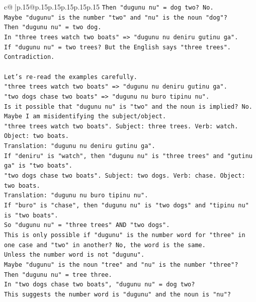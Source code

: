 \documentclass{article}
\begin{document}
{\begin{supertabular}{c@{$\;$}|p{.15\linewidth}@{}p{.15\linewidth}p{.15\linewidth}p{.15\linewidth}p{.15\linewidth}p{.15\linewidth}}
{{{\texttt{Then "dugunu nu" = dog two? No.} \\
\texttt{Maybe "dugunu" is the number "two" and "nu" is the noun "dog"?} \\
\texttt{Then "dugunu nu" = two dog.} \\
\texttt{In "three trees watch two boats" => "dugunu nu deniru gutinu ga".} \\
\texttt{If "dugunu nu" = two trees? But the English says "three trees".} \\
\texttt{Contradiction.} \\
\\ 
\texttt{Let's re{-}read the examples carefully.} \\
\texttt{"three trees watch two boats" => "dugunu nu deniru gutinu ga".} \\
\texttt{"two dogs chase two boats" => "dugunu nu buro tipinu nu".} \\
\texttt{Is it possible that "dugunu nu" is "two" and the noun is implied? No.} \\
\texttt{Maybe I am misidentifying the subject/object.} \\
\texttt{"three trees watch two boats". Subject: three trees. Verb: watch. Object: two boats.} \\
\texttt{Translation: "dugunu nu deniru gutinu ga".} \\
\texttt{If "deniru" is "watch", then "dugunu nu" is "three trees" and "gutinu ga" is "two boats".} \\
\texttt{"two dogs chase two boats". Subject: two dogs. Verb: chase. Object: two boats.} \\
\texttt{Translation: "dugunu nu buro tipinu nu".} \\
\texttt{If "buro" is "chase", then "dugunu nu" is "two dogs" and "tipinu nu" is "two boats".} \\
\texttt{So "dugunu nu" = "three trees" AND "two dogs".} \\
\texttt{This is only possible if "dugunu" is the number word for "three" in one case and "two" in another? No, the word is the same.} \\
\texttt{Unless the number word is not "dugunu".} \\
\texttt{Maybe "dugunu" is the noun "tree" and "nu" is the number "three"?} \\
\texttt{Then "dugunu nu" = tree three.} \\
\texttt{In "two dogs chase two boats", "dugunu nu" = dog two?} \\
\texttt{This suggests the number word is "dugunu" and the noun is "nu"?} \\
}}}
\end{supertabular}}
\end{document}
